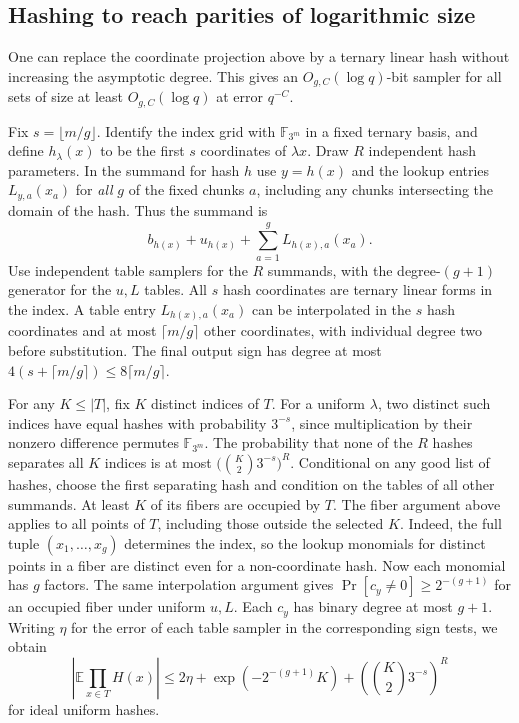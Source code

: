 \documentclass[11pt]{article}
\begin{document}
\subsection{Hashing to reach parities of logarithmic size}
\label{sec:hashed-large-parities}

One can replace the coordinate projection above by a ternary linear
hash without increasing the asymptotic degree. This gives an
$O_{g,C}(\log q)$-bit sampler for all sets of size at least
$O_{g,C}(\log q)$ at error $q^{-C}$.

Fix $s=\lfloor m/g\rfloor$. Identify the index grid with
$\mathbb F_{3^m}$ in a fixed ternary basis, and define
$h_\lambda(x)$ to be the first $s$ coordinates of $\lambda x$.
Draw $R$ independent hash parameters. In the summand for hash $h$
use $y=h(x)$ and the lookup entries $L_{y,a}(x_a)$ for
\emph{all} $g$ of the fixed chunks $a$, including any chunks
intersecting the domain of the hash. Thus the summand is
\[
 b_{h(x)}+u_{h(x)}+\sum_{a=1}^g L_{h(x),a}(x_a).
\]
Use independent table samplers for the $R$ summands, with the
degree-$(g+1)$ generator for the $u,L$ tables. All $s$ hash
coordinates are ternary linear forms in the index. A table entry
$L_{h(x),a}(x_a)$ can be interpolated in the $s$ hash coordinates
and at most $\lceil m/g\rceil$ other coordinates, with individual
degree two before substitution. The final output sign has degree
at most $4(s+\lceil m/g\rceil)\le8\lceil m/g\rceil$.

For any $K\le |T|$, fix $K$ distinct indices of $T$. For a
uniform $\lambda$, two distinct such indices have equal hashes
with probability $3^{-s}$, since multiplication by their
nonzero difference permutes $\mathbb F_{3^m}$. The probability
that none of the $R$ hashes separates all $K$ indices is at most
$\bigl(\binom K2 3^{-s}\bigr)^R$. Conditional on any good list
of hashes, choose the first separating hash and condition on the
tables of all other summands. At least $K$ of its fibers are
occupied by $T$. The fiber argument above applies to all points
of $T$, including those outside the selected $K$. Indeed, the
full tuple $(x_1,\ldots,x_g)$ determines the index, so the
lookup monomials for distinct points in a fiber are distinct even
for a non-coordinate hash. Now each monomial has $g$ factors.
The same interpolation argument gives
$\Pr[c_y\ne0]\ge2^{-(g+1)}$ for an occupied fiber under
uniform $u,L$. Each $c_y$ has binary degree at most $g+1$.
Writing $\eta$ for the error of each table sampler in the
corresponding sign tests, we obtain
\[
 \left|\mathbb E\prod_{x\in T}H(x)\right|
 \le 2\eta+\exp(-2^{-(g+1)}K)+
      \left(\binom K2 3^{-s}\right)^R
\]
for ideal uniform hashes.
\end{document}
